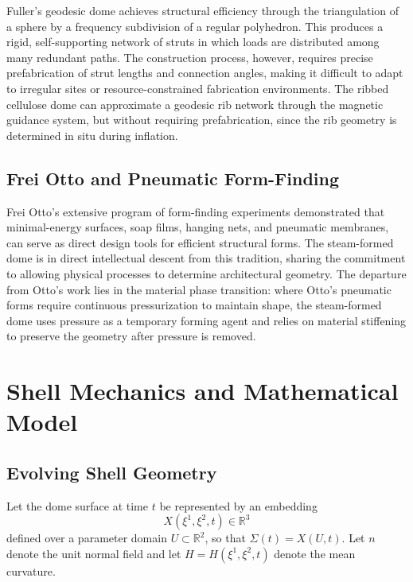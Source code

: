 \documentclass[12pt,a4paper]{article}
\begin{document}
Fuller's geodesic dome achieves structural efficiency through the
triangulation of a sphere by a frequency subdivision of a regular
polyhedron. This produces a rigid, self-supporting network of struts
in which loads are distributed among many redundant paths. The
construction process, however, requires precise prefabrication of
strut lengths and connection angles, making it difficult to adapt to
irregular sites or resource-constrained fabrication environments. The
ribbed cellulose dome can approximate a geodesic rib network through
the magnetic guidance system, but without requiring prefabrication,
since the rib geometry is determined in situ during inflation.

\subsection{Frei Otto and Pneumatic Form-Finding}

Frei Otto's extensive program of form-finding experiments demonstrated
that minimal-energy surfaces, soap films, hanging nets, and pneumatic
membranes, can serve as direct design tools for efficient structural
forms. The steam-formed dome is in direct intellectual descent from
this tradition, sharing the commitment to allowing physical processes
to determine architectural geometry. The departure from Otto's work
lies in the material phase transition: where Otto's pneumatic forms
require continuous pressurization to maintain shape, the steam-formed
dome uses pressure as a temporary forming agent and relies on material
stiffening to preserve the geometry after pressure is removed.

\section{Shell Mechanics and Mathematical Model}

\subsection{Evolving Shell Geometry}

Let the dome surface at time $t$ be represented by an embedding
\begin{equation}
X(\xi^1,\xi^2,t) \in \mathbb{R}^3
\end{equation}
defined over a parameter domain $U \subset \mathbb{R}^2$, so that
$\Sigma(t) = X(U,t)$. Let $n$ denote the unit normal field and let
$H = H(\xi^1,\xi^2,t)$ denote the mean curvature.
\end{document}
